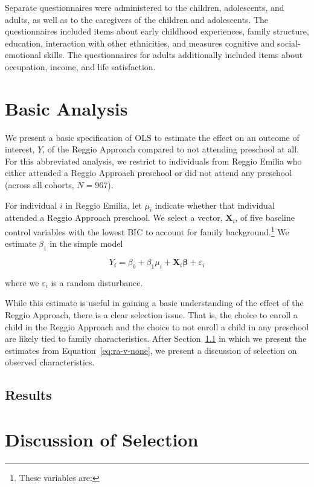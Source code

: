 Separate questionnaires were administered to the children, adolescents, and adults, as well as to the caregivers of the children and adolescents. The questionnaires included items about early childhood experiences, family structure, education, interaction with other ethnicities, and measures cognitive and social-emotional skills. The questionnaires for adults additionally included items about occupation, income, and life satisfaction. 

\section{Basic Analysis}
\label{sec:methodology}

We present a basic specification of OLS to estimate the effect on an outcome of interest, $Y$, of the Reggio Approach compared to not attending preschool at all. For this abbreviated analysis, we restrict to individuals from Reggio Emilia who either attended a Reggio Approach preschool or did not attend any preschool (across all cohorts, $N = 967$).

For individual $i$ in Reggio Emilia, let $\mu_i$ indicate whether that individual attended a Reggio Approach preschool. We select a vector, $\bm{X}_i$, of five baseline control variables with the lowest BIC to account for family background.\footnote{These variables are: \color{maroon}{forthcoming}} We estimate $\beta_1$ in the simple model

\begin{equation}
	Y_i = \beta_0 + \beta_1 \mu_i + \bm{X}_i\bm{\beta} + \varepsilon_i
	\label{eq:ra-v-none}
\end{equation}

\noindent where we $\varepsilon_i$ is a random disturbance. 

While this estimate is useful in gaining a basic understanding of the effect of the Reggio Approach, there is a clear selection issue. That is, the choice to enroll a child in the Reggio Approach and the choice to not enroll a child in any preschool are likely tied to family characteristics. After Section~\ref{sec:results} in which we present the estimates from Equation~\eqref{eq:ra-v-none}, we present a discussion of selection on observed characteristics.

\subsection{Results}
\label{sec:results}

\section{Discussion of Selection}
\label{sec:selection}


